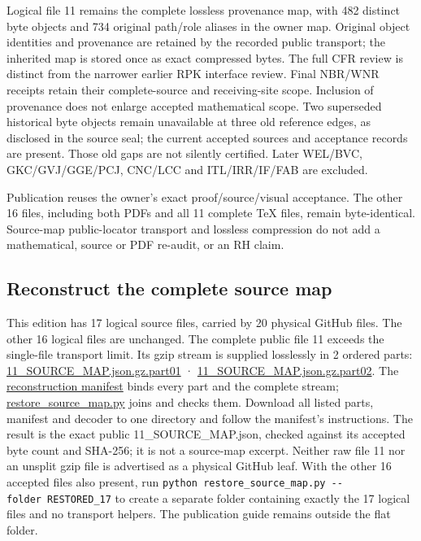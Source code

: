 \documentclass[
]{article}
\begin{document}
Logical file 11 remains the complete lossless provenance map, with 482
distinct byte objects and 734 original path/role aliases in the owner
map. Original object identities and provenance are retained by the
recorded public transport; the inherited map is stored once as exact
compressed bytes. The full CFR review is distinct from the narrower
earlier RPK interface review. Final NBR/WNR receipts retain their
complete-source and receiving-site scope. Inclusion of provenance does
not enlarge accepted mathematical scope. Two superseded historical byte
objects remain unavailable at three old reference edges, as disclosed in
the source seal; the current accepted sources and acceptance records are
present. Those old gaps are not silently certified. Later WEL/BVC,
GKC/GVJ/GGE/PCJ, CNC/LCC and ITL/IRR/IF/FAB are excluded.

Publication reuses the owner's exact proof/source/visual acceptance. The
other 16 files, including both PDFs and all 11 complete TeX files,
remain byte-identical. Source-map public-locator transport and lossless
compression do not add a mathematical, source or PDF re-audit, or an RH
claim.

\subsection{Reconstruct the complete source
map}\label{reconstruct-the-complete-source-map}

This edition has 17 logical source files, carried by 20 physical GitHub
files. The other 16 logical files are unchanged. The complete public
file 11 exceeds the single-file transport limit. Its gzip stream is
supplied losslessly in 2 ordered parts:
\href{https://github.com/KokunoYumeto/zeta-function-research-reader/blob/main/workbenches/splitzero-tandem/continuations/20260915-native-boundary-continuation/11_SOURCE_MAP.json.gz.part01}{11\_SOURCE\_MAP.json.gz.part01}
·
\href{https://github.com/KokunoYumeto/zeta-function-research-reader/blob/main/workbenches/splitzero-tandem/continuations/20260915-native-boundary-continuation/11_SOURCE_MAP.json.gz.part02}{11\_SOURCE\_MAP.json.gz.part02}.
The
\href{https://github.com/KokunoYumeto/zeta-function-research-reader/blob/main/workbenches/splitzero-tandem/continuations/20260915-native-boundary-continuation/SOURCE_MAP_TRANSPORT.json}{reconstruction
manifest} binds every part and the complete stream;
\href{https://github.com/KokunoYumeto/zeta-function-research-reader/blob/main/workbenches/splitzero-tandem/continuations/20260915-native-boundary-continuation/restore_source_map.py}{restore\_source\_map.py}
joins and checks them. Download all listed parts, manifest and decoder
to one directory and follow the manifest's instructions. The result is
the exact public 11\_SOURCE\_MAP.json, checked against its accepted byte
count and SHA-256; it is not a source-map excerpt. Neither raw file 11
nor an unsplit gzip file is advertised as a physical GitHub leaf. With
the other 16 accepted files also present, run
\texttt{python\ restore\_source\_map.py\ -\/-folder\ RESTORED\_17} to
create a separate folder containing exactly the 17 logical files and no
transport helpers. The publication guide remains outside the flat
folder.
\end{document}
